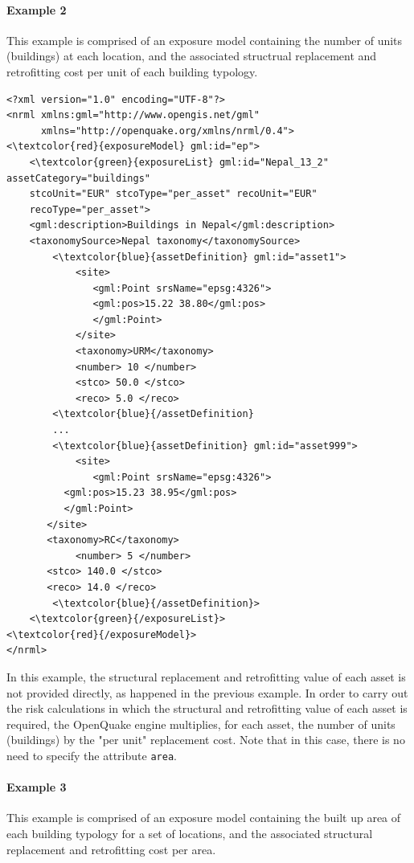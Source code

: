 \paragraph{Example 2}
This example is comprised of an \gls{exposure model} containing the number of units (buildings) at each location, and the associated structrual replacement and retrofitting cost per unit of each building typology.

\begin{Verbatim}[frame=single, commandchars=\\\{\}, samepage=false]
<?xml version="1.0" encoding="UTF-8"?>
<nrml xmlns:gml="http://www.opengis.net/gml"
      xmlns="http://openquake.org/xmlns/nrml/0.4">
<\textcolor{red}{exposureModel} gml:id="ep">
    <\textcolor{green}{exposureList} gml:id="Nepal_13_2" assetCategory="buildings" 
    stcoUnit="EUR" stcoType="per_asset" recoUnit="EUR" 
    recoType="per_asset">
    <gml:description>Buildings in Nepal</gml:description>
    <taxonomySource>Nepal taxonomy</taxonomySource>
        <\textcolor{blue}{assetDefinition} gml:id="asset1">
            <site>
               <gml:Point srsName="epsg:4326">
               <gml:pos>15.22 38.80</gml:pos>
               </gml:Point>
            </site>
            <taxonomy>URM</taxonomy>
            <number> 10 </number>
            <stco> 50.0 </stco>
            <reco> 5.0 </reco>
        <\textcolor{blue}{/assetDefinition} 
        ...
        <\textcolor{blue}{assetDefinition} gml:id="asset999">
            <site>
               <gml:Point srsName="epsg:4326">
	      <gml:pos>15.23 38.95</gml:pos>
	      </gml:Point>
	   </site>
	   <taxonomy>RC</taxonomy>
            <number> 5 </number>
	   <stco> 140.0 </stco>
	   <reco> 14.0 </reco>
        <\textcolor{blue}{/assetDefinition}> 
    <\textcolor{green}{/exposureList}>
<\textcolor{red}{/exposureModel}>
</nrml>
\end{Verbatim}

In this example, the structural replacement and retrofitting value of each asset is not provided directly, as happened in the previous example. In order to carry out the risk calculations in which the structural and retrofitting value of each asset is required, the OpenQuake engine multiplies, for each asset, the number of units (buildings) by the "per unit" replacement cost. Note that in this case, there is no need to specify the attribute \Verb+area+. 

\paragraph{Example 3}
This example is comprised of an \gls{exposure model} containing the built up area of each building typology for a set of locations, and the associated structural replacement and retrofitting cost per area.

